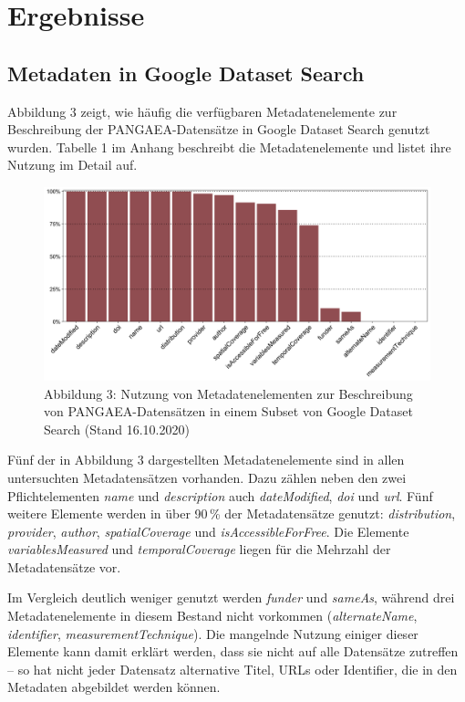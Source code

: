 \documentclass[a4paper,
fontsize=11pt,
oneside,
numbers=noperiodatend,
parskip=half-,
bibliography=totoc,
final
]{scrartcl}
\begin{document}
\hypertarget{ergebnisse}{%
\section{Ergebnisse}\label{ergebnisse}}

\hypertarget{metadaten-in-google-dataset-search}{%
\subsection{Metadaten in Google Dataset
Search}\label{metadaten-in-google-dataset-search}}

Abbildung 3 zeigt, wie häufig die verfügbaren Metadatenelemente zur
Beschreibung der PANGAEA-Datensätze in Google Dataset Search genutzt
wurden. Tabelle 1 im Anhang beschreibt die Metadatenelemente und listet
ihre Nutzung im Detail auf.

\begin{figure}[h!]
\centering
\includegraphics[width=.9\textwidth]{img/abb3_GDS_element_use.png}
\caption{Abbildung 3: Nutzung von Metadatenelementen zur Beschreibung
von PANGAEA-Datensätzen in einem Subset von Google Dataset Search (Stand
16.10.2020)}
\end{figure}

Fünf der in Abbildung 3 dargestellten Metadatenelemente sind in allen
untersuchten Metadatensätzen vorhanden. Dazu zählen neben den zwei
Pflichtelementen \emph{name} und \emph{description} auch
\emph{dateModified}, \emph{doi} und \emph{url}. Fünf weitere Elemente
werden in über 90\,\% der Metadatensätze genutzt: \emph{distribution},
\emph{provider}, \emph{author}, \emph{spatialCoverage} und
\emph{isAccessibleForFree}. Die Elemente \emph{variablesMeasured} und
\emph{temporalCoverage} liegen für die Mehrzahl der Metadatensätze vor.

Im Vergleich deutlich weniger genutzt werden \emph{funder} und
\emph{sameAs}, während drei Metadatenelemente in diesem Bestand nicht
vorkommen (\emph{alternateName}, \emph{identifier},
\emph{measurementTechnique}). Die mangelnde Nutzung einiger dieser
Elemente kann damit erklärt werden, dass sie nicht auf alle Datensätze
zutreffen -- so hat nicht jeder Datensatz alternative Titel, URLs oder
Identifier, die in den Metadaten abgebildet werden können.
\end{document}
